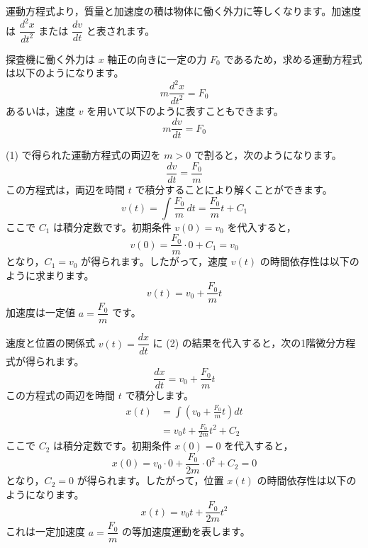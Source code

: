 \solutionheading
\begin{solutionparts}

運動方程式より，質量と加速度の積は物体に働く外力に等しくなります。加速度は $\dfrac{d^2x}{dt^2}$ または $\dfrac{dv}{dt}$ と表されます。

探査機に働く外力は $x$ 軸正の向きに一定の力 $F_0$ であるため，求める運動方程式は以下のようになります。
\begin{equation*}
  m\frac{d^2x}{dt^2}=F_0
\end{equation*}
あるいは，速度 $v$ を用いて以下のように表すこともできます。
\begin{equation*}
  m\frac{dv}{dt}=F_0
\end{equation*}

(1) で得られた運動方程式の両辺を $m>0$ で割ると，次のようになります。
\begin{equation*}
  \frac{dv}{dt}=\frac{F_0}{m}
\end{equation*}
この方程式は，両辺を時間 $t$ で積分することにより解くことができます。
\begin{equation*}
  v(t)=\int\frac{F_0}{m}\,dt=\frac{F_0}{m}t+C_1
\end{equation*}
ここで $C_1$ は積分定数です。初期条件 $v(0)=v_0$ を代入すると，
\begin{equation*}
  v(0)=\frac{F_0}{m}\cdot 0+C_1=v_0
\end{equation*}
となり，$C_1=v_0$ が得られます。したがって，速度 $v(t)$ の時間依存性は以下のように求まります。
\begin{equation*}
  \boxed{v(t)=v_0+\frac{F_0}{m}t}
\end{equation*}
加速度は一定値 $a=\dfrac{F_0}{m}$ です。

速度と位置の関係式 $v(t)=\dfrac{dx}{dt}$ に (2) の結果を代入すると，次の1階微分方程式が得られます。
\begin{equation*}
  \frac{dx}{dt}=v_0+\frac{F_0}{m}t
\end{equation*}
この方程式の両辺を時間 $t$ で積分します。
\begin{align*}
  x(t)
  &=\int\left(v_0+\frac{F_0}{m}t\right)dt \\
  &=v_0t+\frac{F_0}{2m}t^2+C_2
\end{align*}
ここで $C_2$ は積分定数です。初期条件 $x(0)=0$ を代入すると，
\begin{equation*}
  x(0)=v_0\cdot 0+\frac{F_0}{2m}\cdot 0^2+C_2=0
\end{equation*}
となり，$C_2=0$ が得られます。したがって，位置 $x(t)$ の時間依存性は以下のようになります。
\begin{equation*}
  \boxed{x(t)=v_0t+\frac{F_0}{2m}t^2}
\end{equation*}
これは一定加速度 $a=\dfrac{F_0}{m}$ の等加速度運動を表します。


\end{solutionparts}
